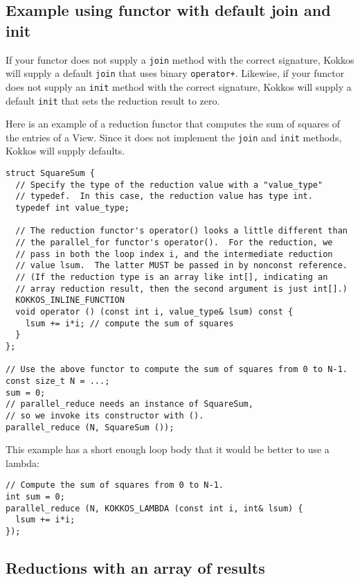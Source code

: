 \subsection{Example using functor with default join and init}

If your functor does not supply a \lstinline!join! method with the correct signature,
Kokkos will supply a default \lstinline!join! that uses binary \lstinline!operator+!.
Likewise, if your functor does not supply an \lstinline!init! method with the correct signature,
Kokkos will supply a default \lstinline!init! that sets the reduction result to zero.

Here is an example of a reduction functor that computes the sum of squares
of the entries of a View.
Since it does not implement the \lstinline!join! and \lstinline!init! methods,
Kokkos will supply defaults.
\begin{lstlisting}
struct SquareSum {
  // Specify the type of the reduction value with a "value_type"
  // typedef.  In this case, the reduction value has type int.
  typedef int value_type;

  // The reduction functor's operator() looks a little different than
  // the parallel_for functor's operator().  For the reduction, we
  // pass in both the loop index i, and the intermediate reduction
  // value lsum.  The latter MUST be passed in by nonconst reference.
  // (If the reduction type is an array like int[], indicating an
  // array reduction result, then the second argument is just int[].)
  KOKKOS_INLINE_FUNCTION
  void operator () (const int i, value_type& lsum) const {
    lsum += i*i; // compute the sum of squares
  }
};

// Use the above functor to compute the sum of squares from 0 to N-1.
const size_t N = ...;
sum = 0;
// parallel_reduce needs an instance of SquareSum, 
// so we invoke its constructor with ().
parallel_reduce (N, SquareSum ());
\end{lstlisting}
This example has a short enough loop body that it would be better to use a lambda:
\begin{lstlisting}
// Compute the sum of squares from 0 to N-1.
int sum = 0;
parallel_reduce (N, KOKKOS_LAMBDA (const int i, int& lsum) { 
  lsum += i*i; 
});
\end{lstlisting}

\subsection{Reductions with an array of results}

